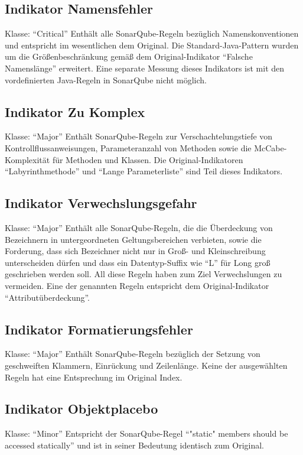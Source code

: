 \documentclass[da,ngerman]{stthesis}
\begin{document}
  			\subsection{Indikator Namensfehler} 
  				Klasse: "`Critical"' \newline
  				Enthält alle SonarQube-Regeln bezüglich Namenskonventionen und entspricht im wesentlichen dem Original. Die Standard-Java-Pattern wurden um die Größenbeschränkung gemäß dem Original-Indikator "`Falsche Namenslänge"' erweitert. Eine separate Messung dieses Indikators ist mit den vordefinierten Java-Regeln in SonarQube nicht möglich.
  			\subsection{Indikator Zu Komplex}
  				Klasse: "`Major"' \newline
  				Enthält SonarQube-Regeln zur Verschachtelungstiefe von Kontrollflussanweisungen, Parameteranzahl von Methoden sowie die McCabe-Komplexität für Methoden und Klassen. Die Original-Indikatoren "`Labyrinthmethode"' und "`Lange Parameterliste"' sind Teil dieses Indikators.
  			\subsection{Indikator Verwechslungsgefahr}
  				Klasse: "`Major"' \newline
  				Enthält alle SonarQube-Regeln, die die Überdeckung von Bezeichnern in untergeordneten Geltungsbereichen verbieten, sowie die Forderung, dass sich Bezeichner nicht nur in Groß- und Kleinschreibung unterscheiden dürfen und dass ein Datentyp-Suffix wie "`L"' für Long groß geschrieben werden soll. All diese Regeln haben zum Ziel Verwechslungen zu vermeiden. Eine der genannten Regeln entspricht dem Original-Indikator "`Attributüberdeckung"'.
  			\subsection{Indikator Formatierungsfehler}
  				Klasse: "`Major"' \newline
  				Enthält SonarQube-Regeln bezüglich der Setzung von geschweiften Klammern, Einrückung und Zeilenlänge. Keine der ausgewählten Regeln hat eine Entsprechung im Original Index.
  			\subsection{Indikator Objektplacebo}
  				Klasse: "`Minor"' \newline
  				Entspricht der SonarQube-Regel "`"static" members should be accessed statically"' und ist in seiner Bedeutung identisch zum Original.
\end{document}
